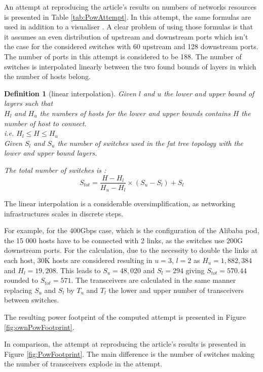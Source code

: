 \documentclass[conference]{IEEEtran} %
\newtheorem{definition}{Definition} %
\begin{document}
An attempt at reproducing the article's results on numbers of networks resources is presented in Table \ref{tab:PowAttempt}. 
In this attempt, the same formulas \cite{Demy} are used in addition to a visualiser \cite{fatTreeVis}. A clear problem of using those formulas is that it assumes an even distribution of upstream and downstream ports which isn't the case for the considered switches with 60 upstream and 128 downstream ports. The number of ports in this attempt is considered to be 188.  
The number of switches is interpolated linearly between the two found bounds of layers in which the number of hosts belong.
\begin{definition}[linear interpolation]
	Given $l$ and $u$ the lower and upper bound of layers such that\\
	$H_l$ and $H_u$ the numbers of hosts for the lower and upper bounds contains $H$ the number of host to connect.\\
	i.e. $H_l \leq H \leq H_u$ \\
	Given $S_l$ and $S_u$ the number of switches used in the fat tree topology with the lower and upper bound layers.  

	The total number of switches is :
	$$ S_{tot} = \frac{H - H_l}{H_u - H_l} \times (S_u - S_l) + S_l$$
	
\end{definition}
The linear interpolation is a considerable oversimplification, as networking infrastructures scales in discrete steps.

For example, for the 400Gbps case, which is the configuration of the Alibaba pod\cite{MLCluster}, the 15 000 hosts have to be connected with 2 links, as the switches use 200G downstream ports. 
For the calculation, due to the necessity to double the links at each host, 30K hosts are considered resulting in $u = 3$, $l = 2$ as $H_u = 1,882,384$ and $H_l = 19,208$. This leads to $S_u = 48,020$ and $S_l = 294$ giving $S_{tot} = 570.44$ rounded to $S_{tot} = 571$.
The transceivers are calculated in the same manner replacing $S_u$ and $S_l$ by $T_u$ and $T_l$ the lower and upper number of transceivers between switches.

The resulting power footprint of the computed attempt is presented in Figure \ref{fig:ownPowFootprint}.

In comparison, the attempt at reproducing the article's results is presented in Figure \ref{fig:PowFootprint}. 
The main difference is the number of switches making the number of transceivers explode in the attempt.
\end{document}
